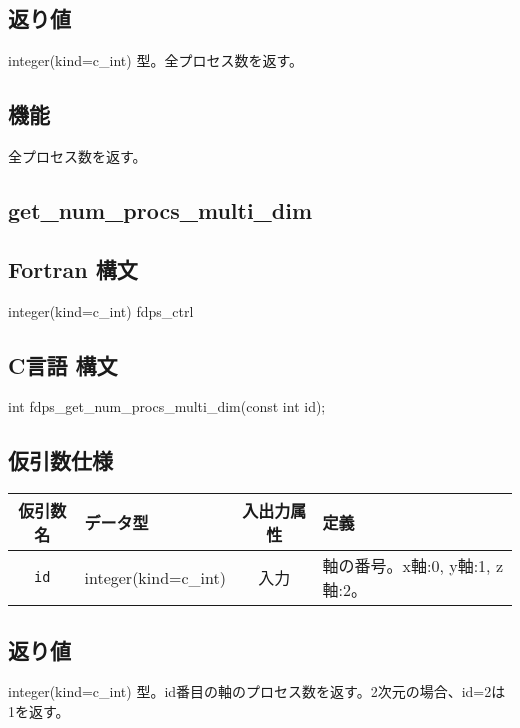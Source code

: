 \subsection*{返り値}
integer(kind=c\_int) 型。全プロセス数を返す。

\subsection*{機能}
全プロセス数を返す。
\clearpage

\subsection{get\_num\_procs\_multi\_dim}
\subsection*{Fortran 構文}
\begin{screen}
\begin{spverbatim}
integer(kind=c_int) fdps_ctrl%
\end{spverbatim}
\end{screen}

\subsection*{C言語 構文}
\begin{screen}
\begin{spverbatim}
int fdps_get_num_procs_multi_dim(const int id);
\end{spverbatim}
\end{screen}

\subsection*{仮引数仕様}
\begin{table}[h]
\begin{tabularx}{\linewidth}{cXcX}
\toprule
\rowcolor{Snow2}
仮引数名 & データ型 & 入出力属性 & 定義 \\
\midrule
\verb|id| & integer(kind=c\_int) & 入力 & 軸の番号。x軸:0, y軸:1, z軸:2。\\
\bottomrule
\end{tabularx}
\end{table}

\subsection*{返り値}
integer(kind=c\_int) 型。id番目の軸のプロセス数を返す。2次元の場合、id=2は1を返す。

